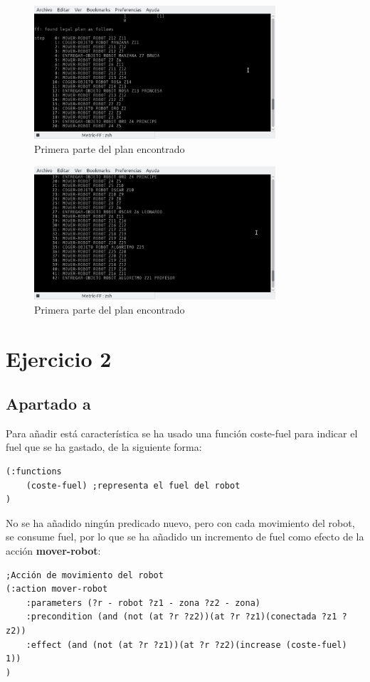 \begin{figure}[H]
	\centering
	\includegraphics[width=0.8\textwidth]{img1}
	\caption{Primera parte del plan encontrado}
\end{figure}
\begin{figure}[H]
	\centering
	\includegraphics[width=0.8\textwidth]{img2}
	\caption{Primera parte del plan encontrado}
\end{figure}

\section{Ejercicio 2}
\subsection{Apartado a}
Para añadir está característica se ha usado una función coste-fuel para indicar el fuel que se ha gastado, de la siguiente forma:
\begin{verbatim}
(:functions
    (coste-fuel) ;representa el fuel del robot
)
\end{verbatim}
No se ha añadido ningún predicado nuevo, pero con cada movimiento del robot, se consume fuel, por lo que se ha añadido un incremento de fuel como efecto de la acción \textbf{mover-robot}:
\begin{verbatim}
;Acción de movimiento del robot
(:action mover-robot
    :parameters (?r - robot ?z1 - zona ?z2 - zona)
    :precondition (and (not (at ?r ?z2))(at ?r ?z1)(conectada ?z1 ?z2))
    :effect (and (not (at ?r ?z1))(at ?r ?z2)(increase (coste-fuel) 1))
)
\end{verbatim}
